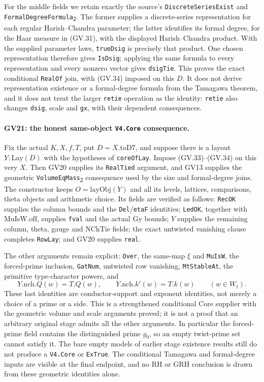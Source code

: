 For the middle fields we retain exactly the source's
\texttt{DiscreteSeriesExist} and \texttt{FormalDegreeFormula\textsubscript{2}}.
The former supplies a discrete-series representation for each
regular Harish--Chandra parameter; the latter identifies its
formal degree, for the Haar measure in (GV.31), with the displayed
Harish--Chandra product. With the supplied parameter laws,
\texttt{trueDsig} is precisely that product. One chosen representation
therefore gives \texttt{IsDsig}; applying the same formula to every
representation and every nonzero vector gives \texttt{dsigTie}.
This proves the exact conditional \texttt{RealOf} join, with
(GV.34) imposed on this $D$. It does not derive representation
existence or a formal-degree formula from the Tamagawa theorem,
and it does not treat the larger \texttt{retie} operation as the
identity: \texttt{retie} also changes \texttt{dsig}, scale and
\texttt{gx}, with their dependent consequences.

\paragraph{GV21: the honest same-object \texttt{V4.Core} consequence.}
Fix the actual $K,X,f,T$, put $D=X.\mathrm{toD7}$, and suppose
there is a layout $Y:\mathrm{Lay}(D)$ with the hypotheses of
\texttt{coreOfLay}. Impose (GV.33)--(GV.34) on this very $X$.
Then GV20 supplies its \texttt{RealTied} argument, and GV13 supplies
the geometric \texttt{VolumeEqMass\textsubscript{2}} consequence
used by the size and formal-degree joins. The constructor keeps
$O=\mathrm{layObj}(Y)$ and all its levels, lattices, comparisons,
theta objects and arithmetic choice. Its fields are verified as
follows: \texttt{RecOK} supplies the column bounds and the
\texttt{Del}/\texttt{etaF} identities; \texttt{LedOK}, together with
$\mathrm{MuIsW.off}$, supplies \texttt{fval} and the actual Gy
bounds; $Y$ supplies the remaining column, theta, gauge and
$\mathrm{NChTie}$ fields; the exact untwisted vanishing clause
completes \texttt{RowLay}; and GV20 supplies \texttt{real}.

The other arguments remain explicit: \texttt{Over}, the same-map
$\xi$ and \texttt{MuIsW}, the forced-prime inclusion,
\texttt{GatNum}, untwisted row vanishing, \texttt{MtStableAt},
the primitive type-character powers, and
\[
   Y.\mathrm{nch}.Q(w)=T.Q(w),\qquad
   Y.\mathrm{nch}.k'(w)=T.k(w)\qquad(w\in W_t).
 \tag{GV.35}
\]
These last identities are conductor-support and exponent identities,
not merely a choice of a prime or a side. This is a strengthened
conditional Core supplier with the geometric volume and scale
arguments proved; it is not a proof that an arbitrary original
stage admits all the other arguments. In particular the forced-prime
field contains the distinguished prime $g_0$, so an empty twist-prime
set cannot satisfy it. The bare empty models of earlier stage
existence results still do not produce a \texttt{V4.Core} or
\texttt{ExTrue}. The conditional Tamagawa and formal-degree inputs
are visible at the final endpoint, and no RH or GRH conclusion is
drawn from these geometric identities alone.
